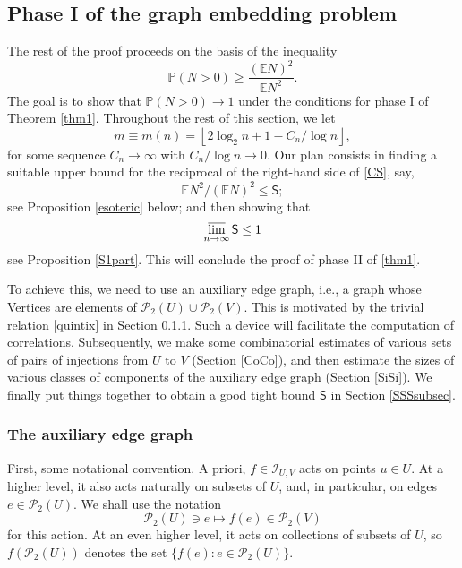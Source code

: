 \documentclass[reqno]{amsart}
\theoremstyle{theorem}
\theoremstyle{definition}
\theoremstyle{remark}
\def\P{\mathbb{P}}
\def\E{\mathbb{E}}
\def\PP{\mathscr{P}}
\newcommand{\1}{{\text{\Large $\mathfrak 1$}}}	%
\renewcommand{\limsup}{\varlimsup}
\numberwithin{equation}{section}
\def\II{\mathscr I}
\def\SSS{\mathsf S}
\begin{document}
\subsection{\bfseries Phase I of the graph embedding problem}
The rest of the proof proceeds on the basis of the inequality
\begin{equation}
\label{CS}
\P(N>0) \ge \frac{(\E N)^2}{\E N^2}.
\end{equation}
The goal is to show that $\P(N>0) \to 1$ under the conditions for phase I
of Theorem \ref{thm1}. %
Throughout the rest of this section, we let
\[
m \equiv m(n) = \left\lfloor 2 \log_2 n+1 - {C_n}/{\log n} \right\rfloor,
\]
for some sequence $C_n \to \infty$ with $C_n/\log n \to 0$.
Our plan consists in finding a suitable upper bound for the
reciprocal of the right-hand side of \eqref{CS}, say,
\[
\E N^2/(\E N)^2 \le \SSS;
\]
see Proposition \ref{esoteric} below;
and then showing that
\[
\limsup_{n \to \infty} \SSS \le 1
\]
see Proposition \ref{S1part}. This will 
conclude the proof of phase II of \eqref{thm1}.


To achieve this, we need to use an auxiliary edge graph, 
i.e., a graph whose Vertices are elements of $\PP_2(U ) \cup \PP_2(V)$.
This is motivated by the trivial relation \eqref{quintix} in Section \ref{PH1emb}.
Such a device will facilitate the computation of correlations.
Subsequently, we make some combinatorial estimates of various sets of
pairs of injections from $U$ to $V$ (Section \ref{CoCo}),
and then estimate the sizes of various classes of components of
the auxiliary edge graph (Section \ref{SiSi}).
We finally put things together to obtain a good tight bound $\SSS$
in Section \ref{SSSsubsec}.



\subsubsection{\bfseries The auxiliary edge graph}
\label{PH1emb}
First, some notational convention.
A priori, $f \in \II_{U,V}$ acts on points $u \in U$.
At a higher level, it also acts naturally on subsets of $U$, and, in particular,
on edges $e \in \PP_2(U)$. We shall use the notation 
\[
\PP_2(U) \ni e \mapsto f(e) \in \PP_2(V)
\]
for this action. At an even higher level, it acts on collections of subsets of $U$,
so $f(\PP_2(U))$ denotes the set $\{f(e): e \in \PP_2(U)\}$.
\end{document}
